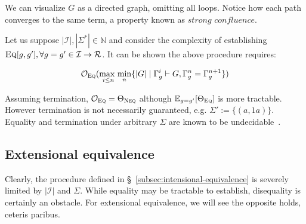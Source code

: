 \documentclass[11pt]{article}
\begin{document}
    \noindent We can visualize $G$ as a directed graph, omitting all loops. Notice how each path converges to the same term, a property known as $\textit{strong confluence}$.

    \hspace{12pt}

    \noindent Let us suppose $|\mathcal{I}|, |\Sigma^*| \in \mathbb{N}$ and consider the complexity of establishing $\textsc{Eq}[g, g'], \forall g = g' \in \mathcal{I} \rightarrow \mathcal{R}$. It can be shown the above procedure requires:

    $$\mathcal{O}_{\textsc{Eq}}(\underset{i \leq n}{\text{max }}\underset{n}{\text{min}}\{|G| \mid \Gamma^i_g \vdash G, \Gamma_g^n = \Gamma_g^{n+1}\})$$ %

    \noindent Assuming termination, $\mathcal{O}_{\textsc{Eq}} = \Theta_{\textsc{Neq}}$ although $\mathbb{E}_{g=g'}[\Theta_\textsc{Eq}]$ is more tractable. However termination is not necessarily guaranteed, e.g. $\Sigma' := \{(a, 1a)\}$. Equality and termination under arbitrary $\Sigma$ are known to be undecidable~\citep{baader1999term}.

    \subsection{Extensional equivalence}\label{subsec:extensional-equivalence}

    Clearly, the procedure defined in \S~\ref{subsec:intensional-equivalence} is severely limited by $|\mathcal{I}|$ and $\Sigma$. While equality may be tractable to establish, disequality is certainly an obstacle. For extensional equivalence, we will see the opposite holds, ceteris paribus.
\end{document}
